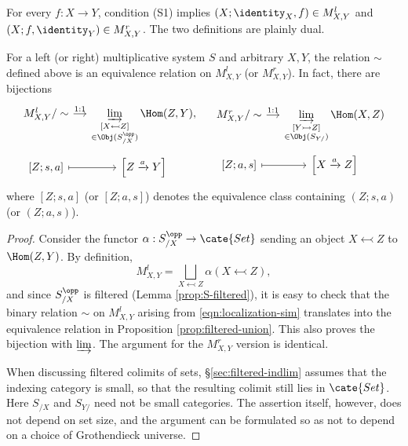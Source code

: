 For every $f:X\to Y$, condition (S1) implies
$(X;\identity_X,f)\in M_{X,Y}^l$ and
$(X;f,\identity_Y)\in M_{X,Y}^r$. The two definitions are plainly dual.

\begin{lemma}\label{prop:MXY-equiv}
	For a left (or right) multiplicative system $S$ and arbitrary $X,Y$, the
	relation $\sim$ defined above is an equivalence relation on $M_{X,Y}^l$
	(or $M_{X,Y}^r$). In fact, there are bijections
	\[\begin{tikzcd}[row sep=tiny, column sep=small]
		M_{X, Y}^l /\sim \arrow[r, "1:1"] & \displaystyle\varinjlim_{\substack{[X \leftarrowtail Z] \\ \in \Obj(S_{/X}^{\opp})}} \Hom(Z, Y) , \\
		{[Z; s, a]} \arrow[mapsto, r] & {\left[ Z \xrightarrow{a} Y \right]}
	\end{tikzcd} \quad
	\begin{tikzcd}[row sep=tiny, column sep=small]
		M_{X, Y}^r /\sim \arrow[r, "1:1"] & \displaystyle\varinjlim_{\substack{[Y \rightarrowtail Z] \\ \in \Obj(S_{Y/})}} \Hom(X, Z) \\
		{[Z; a, s]} \arrow[mapsto, r] & {\left[ X \xrightarrow{a} Z \right]}
	\end{tikzcd}\]
	where $[Z;s,a]$ (or $[Z;a,s]$) denotes the equivalence class containing
	$(Z;s,a)$ (or $(Z;a,s)$).
\end{lemma}
\begin{proof}
	Consider the functor $\alpha:S_{/X}^{\opp}\to\cate{Set}$ sending an object
	$X\leftarrowtail Z$ to $\Hom(Z,Y)$. By definition,
	\[ M_{X, Y}^l = \bigsqcup_{X \leftarrowtail Z} \alpha(X \leftarrowtail Z), \]
	and since $S_{/X}^{\opp}$ is filtered (Lemma \ref{prop:S-filtered}), it is
	easy to check that the binary relation $\sim$ on $M_{X,Y}^l$ arising from
	\eqref{eqn:localization-sim} translates into the equivalence relation in
	Proposition \ref{prop:filtered-union}. This also proves the bijection with
	$\varinjlim$. The argument for the $M_{X,Y}^r$ version is identical.

	When discussing filtered colimits of sets, \S\ref{sec:filtered-indlim}
	assumes that the indexing category is small, so that the resulting colimit
	still lies in $\cate{Set}$. Here $S_{/X}$ and $S_{Y/}$ need not be small
	categories. The assertion itself, however, does not depend on set size, and
	the argument can be formulated so as not to depend on a choice of
	Grothendieck universe.
\end{proof}

